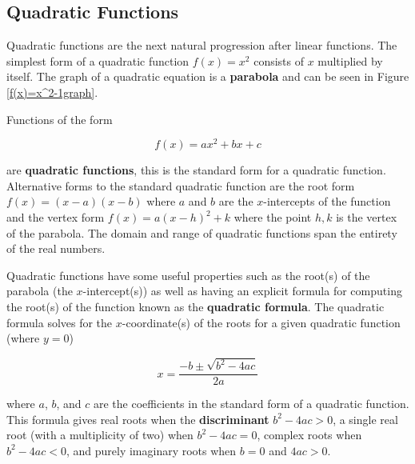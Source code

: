 
\subsection{Quadratic Functions}\label{sect:quadratic functions}

Quadratic functions are the next natural progression after linear functions. The simplest form of a quadratic function $f(x) = x^2$ consists of $x$ multiplied by itself. The graph of a quadratic equation is a \textbf{parabola} and can be seen in Figure \ref{f(x)=x^2-1graph}.

\begin{definition}
    Functions of the form

    \begin{equation}
        f(x) = ax^2 + bx + c
    \end{equation}

    \noindent are \textbf{quadratic functions}, this is the standard form for a quadratic function. Alternative forms to the standard quadratic function are the root form $f(x) = (x-a)(x-b)$ where $a$ and $b$ are the $x$-intercepts of the function and the vertex form $f(x) = a(x-h)^2+k$ where the point $h,k$ is the vertex of the parabola. The domain and range of quadratic functions span the entirety of the real numbers.
\end{definition}

Quadratic functions have some useful properties such as the root(s) of the parabola (the $x$-intercept(s)) as well as having an explicit formula for computing the root(s) of the function known as the \textbf{quadratic formula}. The quadratic formula solves for the $x$-coordinate(s) of the roots for a given quadratic function (where $y=0$)

\begin{equation}
    x = \frac{-b \pm \sqrt{b^2 - 4ac}}{2a}
\end{equation}

\noindent where $a$, $b$, and $c$ are the coefficients in the standard form of a quadratic function. This formula gives real roots when the \textbf{discriminant} $b^2 - 4ac > 0$, a single real root (with a multiplicity of two) when $b^2 - 4ac = 0$, complex roots when $b^2 - 4ac < 0$, and purely imaginary roots when $b = 0$ and $4ac > 0$.

